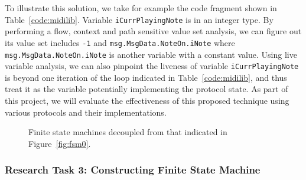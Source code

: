 To illustrate this solution, we take for example the code fragment shown in
Table~\ref{code:midilib}. Variable \texttt{iCurrPlayingNote} is in an integer
type. By performing a flow, context and path sensitive value set analysis, we
can figure out its value set includes \texttt{-1} and
\texttt{msg.MsgData.NoteOn.iNote} where \texttt{msg.MsgData.NoteOn.iNote} is
another variable with a constant value. Using live variable analysis, we can
also pinpoint the liveness of variable \texttt{iCurrPlayingNote} is beyond one iteration 
of the loop indicated in Table~\ref{code:midilib}, and thus treat it as
the variable potentially implementing the protocol state. As part of this
project, we will evaluate the effectiveness of this proposed technique using
various protocols and their implementations.



\begin{figure}[t]
\centering
{} 
\hspace{0.05\textwidth}
\caption{Finite state machines decoupled from that indicated in Figure~\ref{fig:fsm0}.} 
\label{fig:fsm} 
\end{figure} 


\subsubsection{Research Task 3: Constructing Finite State Machine}
\label{subsec:rt3}

